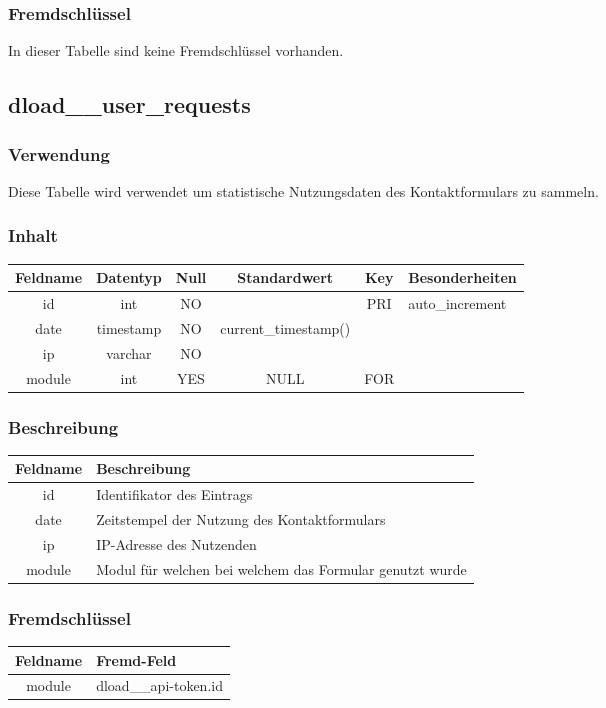 \subsubsection{Fremdschlüssel}
In dieser Tabelle sind keine Fremdschlüssel vorhanden.
\subsection{dload\_\_user\_requests}
\subsubsection{Verwendung} Diese Tabelle wird verwendet um statistische Nutzungsdaten des Kontaktformulars zu sammeln.
\subsubsection{Inhalt}
\begin{table}[H]
	\begin{tabular}{|c|c|c|c|c|p{3.5cm}|}
		\hline
		\textbf{Feldname} & \textbf{Datentyp} & \textbf{Null} & \textbf{Standardwert} & \textbf{Key}   & \textbf{Besonderheiten} \\ \hline
		id & int & NO &  & PRI & auto\_increment \\ \hline
		date & timestamp & NO & current\_timestamp() &  & \\ \hline
		ip & varchar & NO &  &  & \\ \hline
		module & int & YES & NULL & FOR & \\ \hline
	\end{tabular}
\end{table}
\subsubsection{Beschreibung}
\begin{table}[H]
	\begin{tabular}{|c|p{12cm}|}
		\hline
		\textbf{Feldname} & \textbf{Beschreibung} \\ \hline
		id & Identifikator des Eintrags \\ \hline
		date & Zeitstempel der Nutzung des Kontaktformulars \\ \hline
		ip & IP-Adresse des Nutzenden \\ \hline
		module & Modul für welchen bei welchem das Formular genutzt wurde \\ \hline
	\end{tabular}
\end{table}
\subsubsection{Fremdschlüssel}
\begin{table}[H]
	\begin{tabular}{|c|p{12.5cm}|}
		\hline
		\textbf{Feldname} & \textbf{Fremd-Feld} \\ \hline
		module & dload\_\_api-token.id \\ \hline
	\end{tabular}
\end{table}